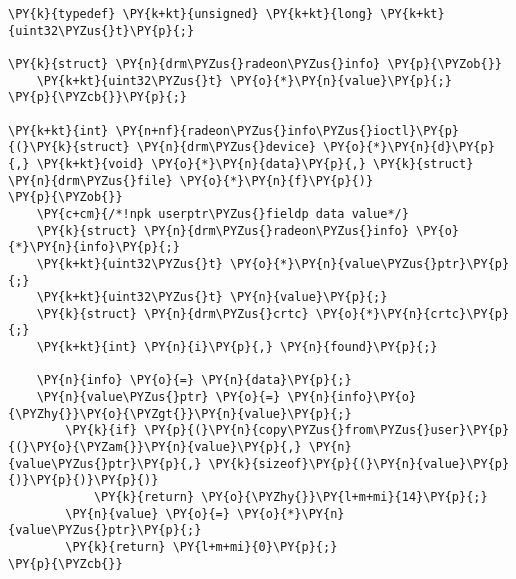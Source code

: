 \begin{Verbatim}[commandchars=\\\{\}]
\PY{k}{typedef} \PY{k+kt}{unsigned} \PY{k+kt}{long} \PY{k+kt}{uint32\PYZus{}t}\PY{p}{;}

\PY{k}{struct} \PY{n}{drm\PYZus{}radeon\PYZus{}info} \PY{p}{\PYZob{}}
    \PY{k+kt}{uint32\PYZus{}t} \PY{o}{*}\PY{n}{value}\PY{p}{;}
\PY{p}{\PYZcb{}}\PY{p}{;}

\PY{k+kt}{int} \PY{n+nf}{radeon\PYZus{}info\PYZus{}ioctl}\PY{p}{(}\PY{k}{struct} \PY{n}{drm\PYZus{}device} \PY{o}{*}\PY{n}{d}\PY{p}{,} \PY{k+kt}{void} \PY{o}{*}\PY{n}{data}\PY{p}{,} \PY{k}{struct} \PY{n}{drm\PYZus{}file} \PY{o}{*}\PY{n}{f}\PY{p}{)}
\PY{p}{\PYZob{}}
	\PY{c+cm}{/*!npk userptr\PYZus{}fieldp data value*/}
	\PY{k}{struct} \PY{n}{drm\PYZus{}radeon\PYZus{}info} \PY{o}{*}\PY{n}{info}\PY{p}{;}
	\PY{k+kt}{uint32\PYZus{}t} \PY{o}{*}\PY{n}{value\PYZus{}ptr}\PY{p}{;}
	\PY{k+kt}{uint32\PYZus{}t} \PY{n}{value}\PY{p}{;}
	\PY{k}{struct} \PY{n}{drm\PYZus{}crtc} \PY{o}{*}\PY{n}{crtc}\PY{p}{;}
	\PY{k+kt}{int} \PY{n}{i}\PY{p}{,} \PY{n}{found}\PY{p}{;}

	\PY{n}{info} \PY{o}{=} \PY{n}{data}\PY{p}{;}
	\PY{n}{value\PYZus{}ptr} \PY{o}{=} \PY{n}{info}\PY{o}{\PYZhy{}}\PY{o}{\PYZgt{}}\PY{n}{value}\PY{p}{;}
        \PY{k}{if} \PY{p}{(}\PY{n}{copy\PYZus{}from\PYZus{}user}\PY{p}{(}\PY{o}{\PYZam{}}\PY{n}{value}\PY{p}{,} \PY{n}{value\PYZus{}ptr}\PY{p}{,} \PY{k}{sizeof}\PY{p}{(}\PY{n}{value}\PY{p}{)}\PY{p}{)}\PY{p}{)}
            \PY{k}{return} \PY{o}{\PYZhy{}}\PY{l+m+mi}{14}\PY{p}{;}
        \PY{n}{value} \PY{o}{=} \PY{o}{*}\PY{n}{value\PYZus{}ptr}\PY{p}{;}
        \PY{k}{return} \PY{l+m+mi}{0}\PY{p}{;}
\PY{p}{\PYZcb{}}
\end{Verbatim}
